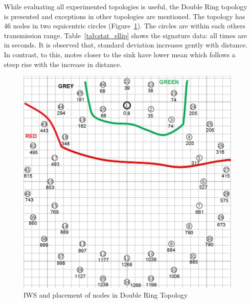 \documentclass{CRPITStyle}
\begin{document}
While evaluating all experimented topologies is useful, the Double Ring topology is presented and  exceptions in other topologies are mentioned.
The topology has 46 nodes in two equicentric circles (Figure~\ref{fig:elliptopo}).
The circles are within each others transmission range.
Table~\ref{tab:stat_ellip} shows the signature data: all times are in seconds.
It is observed that, standard deviation increases gently with distance.
In contrast, to this, %
motes closer to the sink have lower mean which follows a steep rise with the increase in distance.


\begin{figure}[t]
    \centering
        \includegraphics[width=.8\linewidth]{DoubleRingZ}
        \caption{IWS and placement of nodes in Double Ring Topology}
        \label{fig:elliptopo} 
    \end{figure}
\end{document}
